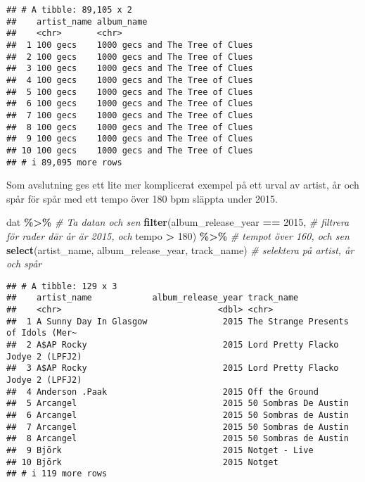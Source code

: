 \documentclass[
]{book}
\newenvironment{Shaded}{\begin{snugshade}}{\end{snugshade}}
\newcommand{\CommentTok}[1]{\textcolor[rgb]{0.56,0.35,0.01}{\textit{#1}}}
\newcommand{\DecValTok}[1]{\textcolor[rgb]{0.00,0.00,0.81}{#1}}
\newcommand{\FunctionTok}[1]{\textcolor[rgb]{0.13,0.29,0.53}{\textbf{#1}}}
\newcommand{\NormalTok}[1]{#1}
\newcommand{\SpecialCharTok}[1]{\textcolor[rgb]{0.81,0.36,0.00}{\textbf{#1}}}
\theoremstyle{definition}
\theoremstyle{definition}
\theoremstyle{definition}
\theoremstyle{definition}
\theoremstyle{remark}
\begin{document}
\begin{verbatim}
## # A tibble: 89,105 x 2
##    artist_name album_name                     
##    <chr>       <chr>                          
##  1 100 gecs    1000 gecs and The Tree of Clues
##  2 100 gecs    1000 gecs and The Tree of Clues
##  3 100 gecs    1000 gecs and The Tree of Clues
##  4 100 gecs    1000 gecs and The Tree of Clues
##  5 100 gecs    1000 gecs and The Tree of Clues
##  6 100 gecs    1000 gecs and The Tree of Clues
##  7 100 gecs    1000 gecs and The Tree of Clues
##  8 100 gecs    1000 gecs and The Tree of Clues
##  9 100 gecs    1000 gecs and The Tree of Clues
## 10 100 gecs    1000 gecs and The Tree of Clues
## # i 89,095 more rows
\end{verbatim}

Som avslutning ges ett lite mer komplicerat exempel på ett urval av artist, år och spår för spår med ett tempo över 180 bpm släppta under 2015.

\begin{Shaded}
\begin{Highlighting}[]
\NormalTok{dat }\SpecialCharTok{\%\textgreater{}\%}                                                    \CommentTok{\# Ta datan och sen}
  \FunctionTok{filter}\NormalTok{(album\_release\_year }\SpecialCharTok{==} \DecValTok{2015}\NormalTok{,                       }\CommentTok{\# filtrera för rader där år är 2015, och }
\NormalTok{         tempo }\SpecialCharTok{\textgreater{}} \DecValTok{180}\NormalTok{) }\SpecialCharTok{\%\textgreater{}\%}                                  \CommentTok{\# tempot över 160, och sen}
  \FunctionTok{select}\NormalTok{(artist\_name, album\_release\_year, track\_name)      }\CommentTok{\# selektera på artist, år och spår}
\end{Highlighting}
\end{Shaded}

\begin{verbatim}
## # A tibble: 129 x 3
##    artist_name            album_release_year track_name                         
##    <chr>                               <dbl> <chr>                              
##  1 A Sunny Day In Glasgow               2015 The Strange Presents of Idols (Mer~
##  2 A$AP Rocky                           2015 Lord Pretty Flacko Jodye 2 (LPFJ2) 
##  3 A$AP Rocky                           2015 Lord Pretty Flacko Jodye 2 (LPFJ2) 
##  4 Anderson .Paak                       2015 Off the Ground                     
##  5 Arcangel                             2015 50 Sombras De Austin               
##  6 Arcangel                             2015 50 Sombras de Austin               
##  7 Arcangel                             2015 50 Sombras de Austin               
##  8 Arcangel                             2015 50 Sombras de Austin               
##  9 Björk                                2015 Notget - Live                      
## 10 Björk                                2015 Notget                             
## # i 119 more rows
\end{verbatim}
\end{document}
